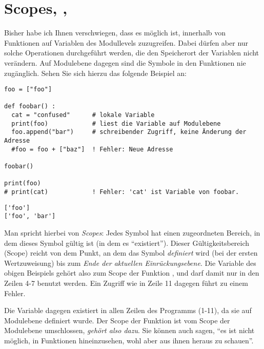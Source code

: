 \section{Scopes, , }
Bisher habe ich Ihnen verschwiegen, dass es möglich ist, innerhalb von Funktionen auf Variablen des Modullevels zuzugreifen. Dabei dürfen aber nur solche Operationen durchgeführt werden, die den Speicherort der Variablen nicht verändern. Auf Modulebene dagegen sind die Symbole in den Funktionen nie zugänglich.
Sehen Sie sich hierzu das folgende Beispiel an:
\begin{codebox}
\begin{verbatim}
foo = ["foo"]

def foobar() :
  cat = "confused"      # lokale Variable
  print(foo)            # liest die Variable auf Modulebene
  foo.append("bar")     # schreibender Zugriff, keine Änderung der Adresse
  #foo = foo + ["baz"]  ! Fehler: Neue Adresse

foobar()

print(foo)
# print(cat)            ! Fehler: 'cat' ist Variable von foobar.
\end{verbatim}
\end{codebox}
\begin{cmdbox}
\begin{verbatim}
['foo']
['foo', 'bar']
\end{verbatim}
\end{cmdbox}

Man spricht hierbei von \emph{Scopes}: Jedes Symbol hat einen zugeordneten Bereich, in dem dieses Symbol gültig ist (in dem es \enquote{existiert}). Dieser Gültigkeitsbereich (Scope) reicht von dem Punkt, an dem das Symbol \emph{definiert} wird (\ie bei der ersten Wertzuweisung) bis zum \emph{Ende der aktuellen Einrückungsebene}. Die Variable  des obigen Beispiels gehört also zum Scope der Funktion , und darf damit nur in den Zeilen 4-7 benutzt werden. Ein Zugriff wie in Zeile 11 dagegen führt zu einem Fehler.

Die Variable  dagegen existiert in allen Zeilen des Programms (1-11), da sie auf Modulebene definiert wurde. Der Scope der Funktion  ist vom Scope der Modulebene umschlossen, \emph{gehört also dazu}. Sie können auch sagen, \enquote{es ist nicht möglich, in Funktionen hineinzusehen, wohl aber aus ihnen heraus zu schauen}.

